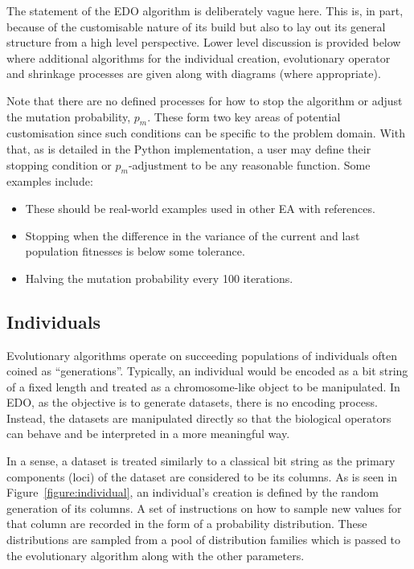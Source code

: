 \label{alg:edo}


The statement of the EDO algorithm is deliberately vague here. This is, in part,
because of the customisable nature of its build but also to lay out its general
structure from a high level perspective. Lower level discussion is provided
below where additional algorithms for the
individual creation, evolutionary operator and shrinkage processes are given
along with diagrams (where appropriate).

Note that there are no defined processes for how to stop the algorithm or adjust
the mutation probability, \(p_m\). These form two key areas of potential
customisation since such conditions can be specific to the problem domain. With
that, as is detailed in the Python implementation, a user may define their
stopping condition or \(p_m\)-adjustment to be any reasonable function. Some
examples include:

\begin{itemize}
    \item These should be real-world examples used in other EA with references.
    \item Stopping when the difference in the variance of the current and last
        population fitnesses is below some tolerance.
    \item Halving the mutation probability every 100 iterations.
\end{itemize}

\subsection{Individuals}

Evolutionary algorithms operate on succeeding populations of individuals often
coined as ``generations''. Typically, an individual would be encoded as a bit
string of a fixed length and treated as a chromosome-like object to be
manipulated. In EDO, as the objective is to generate datasets, there is no
encoding process. Instead, the datasets are manipulated directly so that the
biological operators can behave and be interpreted in a more meaningful way.


In a sense, a dataset is treated similarly to a classical bit string as the
primary components (loci) of the dataset are considered to be its columns. As is
seen in Figure~\ref{figure:individual}, an individual's creation is defined by
the random generation of its columns. A set of instructions on how to sample new
values for that column are recorded in the form of a probability distribution.
These distributions are sampled from a pool of distribution families which is
passed to the evolutionary algorithm along with the other parameters.

